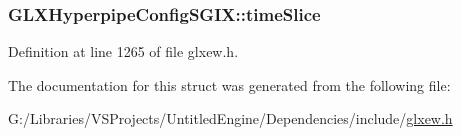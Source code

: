 \subsubsection[{time\+Slice}]{ G\+L\+X\+Hyperpipe\+Config\+S\+G\+I\+X\+::time\+Slice}\label{struct_g_l_x_hyperpipe_config_s_g_i_x_afe9288e75dc1ae5e0f33eff978d7024d}


Definition at line 1265 of file glxew.\+h.



The documentation for this struct was generated from the following file\+:\begin{DoxyCompactItemize}
\item 
G\+:/\+Libraries/\+V\+S\+Projects/\+Untitled\+Engine/\+Dependencies/include/\hyperlink{glxew_8h}{glxew.\+h}\end{DoxyCompactItemize}
